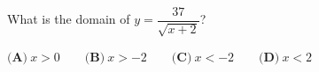 What is the domain of $y=\dfrac{37}{\sqrt{x+2}}$?

$\textbf{(A)}\ x>0\qquad\textbf{(B)}\ x>-2\qquad\textbf{(C)}\ x<-2\qquad\textbf{(D)}\ x<2$
